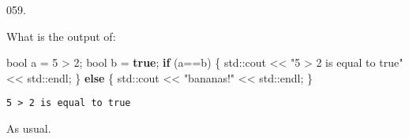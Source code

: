 \documentclass[]{book}
\newenvironment{Shaded}{}{}
\newcommand{\BuiltInTok}[1]{#1}
\newcommand{\ControlFlowTok}[1]{\textcolor[rgb]{0.00,0.44,0.13}{\textbf{#1}}}
\newcommand{\DataTypeTok}[1]{\textcolor[rgb]{0.56,0.13,0.00}{#1}}
\newcommand{\DecValTok}[1]{\textcolor[rgb]{0.25,0.63,0.44}{#1}}
\newcommand{\KeywordTok}[1]{\textcolor[rgb]{0.00,0.44,0.13}{\textbf{#1}}}
\newcommand{\NormalTok}[1]{#1}
\newcommand{\StringTok}[1]{\textcolor[rgb]{0.25,0.44,0.63}{#1}}
\begin{document}
\vspace{2mm}\noindent\hrulefill{}

\begin{minipage}{\linewidth}\noindent
{\tiny 059.}\\
\begin{minipage}[t]{.485\linewidth}

What is the output of:

\begin{framed}

\begin{Shaded}
\begin{Highlighting}[]
\DataTypeTok{bool}\NormalTok{ a = }\DecValTok{5}\NormalTok{ > }\DecValTok{2}\NormalTok{;}
\DataTypeTok{bool}\NormalTok{ b = }\KeywordTok{true}\NormalTok{;}
\ControlFlowTok{if}\NormalTok{ (a==b) \{}
  \BuiltInTok{std::}\NormalTok{cout << }\StringTok{"5 > 2 is equal to true"}
\NormalTok{            << }\BuiltInTok{std::}\NormalTok{endl;}
\NormalTok{\} }\ControlFlowTok{else}\NormalTok{ \{}
  \BuiltInTok{std::}\NormalTok{cout << }\StringTok{"bananas!"}\NormalTok{ << }\BuiltInTok{std::}\NormalTok{endl;}
\NormalTok{\}}
\end{Highlighting}
\end{Shaded}

\end{framed}

\end{minipage}
\hfill
\begin{minipage}[t]{.485\linewidth}

\begin{framed}

\begin{verbatim}
5 > 2 is equal to true
\end{verbatim}

\end{framed}

As usual.

\end{minipage}
\end{minipage}

\vspace{2mm}\noindent\hrulefill{}
\end{document}
